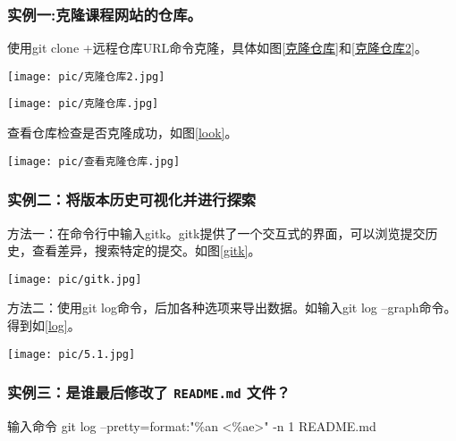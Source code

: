 \documentclass[a4paper]{article}
\begin{document}
    \subsubsection{实例一:克隆课程网站的仓库。}
    
   使用git clone +远程仓库URL命令克隆，具体如图\ref{克隆仓库}和\ref{克隆仓库2}。
 \begin{figure*}[!h]
 \centering
    \texttt{[image: pic/克隆仓库2.jpg]}\caption{克隆仓库2}\label{克隆仓库2}
    \texttt{[image: pic/克隆仓库.jpg]}
    \caption{克隆仓库}
    \label{克隆仓库}
    \end{figure*}
    
查看仓库检查是否克隆成功，如图\ref{look}。
\begin{figure*}[htb!]
 \centering
    \texttt{[image: pic/查看克隆仓库.jpg]}
    \caption{查看克隆仓库}
    \label{look}
\end{figure*}

\vspace{1em} 


     \subsubsection{实例二：将版本历史可视化并进行探索}

方法一：在命令行中输入gitk。gitk提供了一个交互式的界面，可以浏览提交历史，查看差异，搜索特定的提交。如图\ref{gitk}。


\begin{figure*}[!htb]
 \centering
    \texttt{[image: pic/gitk.jpg]}\caption{gitk}\label{gitk}
\end{figure*}

方法二：使用git log命令，后加各种选项来导出数据。如输入git log --graph命令。得到如\ref{log}。

\begin{figure*}[!h]
 \centering
    \texttt{[image: pic/5.1.jpg]}\caption{log}\label{log}
\end{figure*}

\vspace{1em} 

 \subsubsection{实例三：是谁最后修改了 \texttt{README.md} 文件？}

输入命令 git log --pretty=format:"\%an <\%ae>" -n 1 README.md
\end{document}
